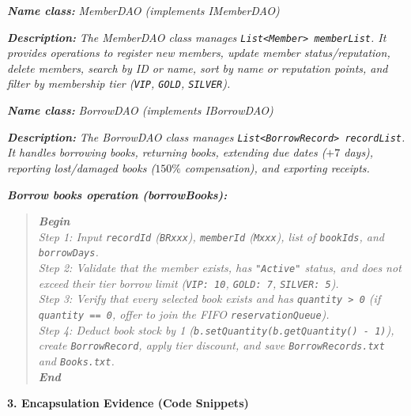 \documentclass[12pt,a4paper]{article}
\begin{document}
\hspace{0.5cm}\textbf{\textit{Name class:}} \textit{MemberDAO (implements IMemberDAO)}

\hspace{0.5cm}\textbf{\textit{Description:}} \textit{The MemberDAO class manages \texttt{List<Member> memberList}. It provides operations to register new members, update member status/reputation, delete members, search by ID or name, sort by name or reputation points, and filter by membership tier (\texttt{VIP}, \texttt{GOLD}, \texttt{SILVER}).}

\hspace{0.5cm}\textbf{\textit{Name class:}} \textit{BorrowDAO (implements IBorrowDAO)}

\hspace{0.5cm}\textbf{\textit{Description:}} \textit{The BorrowDAO class manages \texttt{List<BorrowRecord> recordList}. It handles borrowing books, returning books, extending due dates ($+7$ days), reporting lost/damaged books ($150\%$ compensation), and exporting receipts.}

\hspace{0.5cm}\textbf{\textit{Borrow books operation (borrowBooks):}}
\begin{quote}
\textbf{\textit{Begin}}\\
\hspace*{0.5cm}\textit{Step 1: Input \texttt{recordId} (\texttt{BRxxx}), \texttt{memberId} (\texttt{Mxxx}), list of \texttt{bookIds}, and \texttt{borrowDays}.}\\
\hspace*{0.5cm}\textit{Step 2: Validate that the member exists, has \texttt{"Active"} status, and does not exceed their tier borrow limit (\texttt{VIP: 10}, \texttt{GOLD: 7}, \texttt{SILVER: 5}).}\\
\hspace*{0.5cm}\textit{Step 3: Verify that every selected book exists and has \texttt{quantity > 0} (if \texttt{quantity == 0}, offer to join the FIFO \texttt{reservationQueue}).}\\
\hspace*{0.5cm}\textit{Step 4: Deduct book stock by 1 (\texttt{b.setQuantity(b.getQuantity() - 1)}), create \texttt{BorrowRecord}, apply tier discount, and save \texttt{BorrowRecords.txt} and \texttt{Books.txt}.}\\
\textbf{\textit{End}}
\end{quote}

\textbf{3. Encapsulation Evidence (Code Snippets)}
\end{document}
